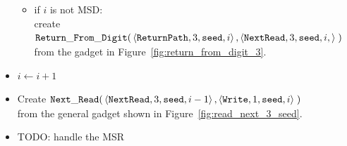 \begin{itemize}
\begin{itemize}
        \item if $i$ is not MSD:\\
        create
        $\begin{aligned}[t]
            {\tt Return\_From\_Digit}(&\left\langle {\tt ReturnPath}, 3, {\tt seed}, i  \right\rangle,
                              \left\langle {\tt NextRead},   3, {\tt seed}, i, \right\rangle \;)
        \end{aligned}$\\from the gadget in Figure~\ref{fig:return_from_digit_3}.

    \end{itemize}


    \item $i \gets i + 1$

    \item Create
    $\begin{aligned}[t]
        {\tt Next\_Read}(&\left\langle {\tt NextRead},  3, {\tt seed}, i - 1 \right\rangle,
                   \left\langle {\tt Write},     1, {\tt seed}, i     \right\rangle \;)
    \end{aligned}$\\ from the general gadget shown in Figure~\ref{fig:read_next_3_seed}.

    \item TODO: handle the MSR
\end{itemize}



